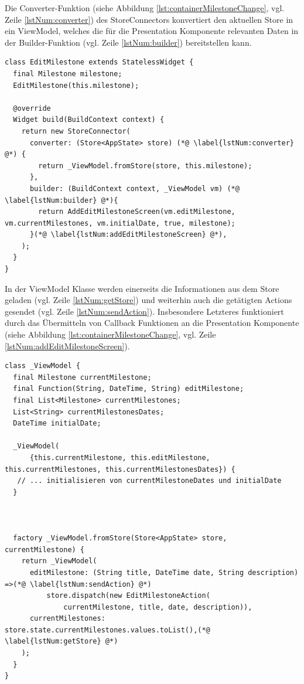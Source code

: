 \documentclass[bibliography=totoc,listof=totoc,BCOR=5mm,DIV=12,oneside]{scrbook}
\begin{document}
\par Die Converter-Funktion (siehe Abbildung \ref{lst:containerMilestoneChange}, vgl. Zeile \ref{lstNum:converter}) des StoreConnectors konvertiert den aktuellen Store in ein ViewModel, welches die für die Presentation Komponente relevanten Daten in der Builder-Funktion (vgl. Zeile \ref{lstNum:builder}) bereitstellen kann.

\bigskip
\begin{lstlisting}[caption={Container Komponente einer Meilensteinänderung},captionpos=b, label=lst:containerMilestoneChange]
class EditMilestone extends StatelessWidget {
  final Milestone milestone;
  EditMilestone(this.milestone);

  @override
  Widget build(BuildContext context) {
    return new StoreConnector(
      converter: (Store<AppState> store) (*@ \label{lstNum:converter} @*) {
        return _ViewModel.fromStore(store, this.milestone);
      },
      builder: (BuildContext context, _ViewModel vm) (*@ \label{lstNum:builder} @*){
        return AddEditMilestoneScreen(vm.editMilestone, vm.currentMilestones, vm.initialDate, true, milestone);
      }(*@ \label{lstNum:addEditMilestoneScreen} @*),
    );
  }
}
\end{lstlisting}
\bigskip

\par In der ViewModel Klasse werden einerseits die Informationen aus dem Store geladen (vgl. Zeile \ref{lstNum:getStore}) und weiterhin auch die getätigten Actions gesendet (vgl. Zeile \ref{lstNum:sendAction}). Insbesondere Letzteres funktioniert durch das Übermitteln von Callback Funktionen an die Presentation Komponente (siehe Abbildung \ref{lst:containerMilestoneChange}, vgl. Zeile \ref{lstNum:addEditMilestoneScreen}).

\newpage
\bigskip
\begin{lstlisting}[caption={ViewModel von Container Komponente einer Meilensteinänderung},captionpos=b, label=lst:containerMilestoneChangeViewModel]
class _ViewModel {
  final Milestone currentMilestone;
  final Function(String, DateTime, String) editMilestone;
  final List<Milestone> currentMilestones;
  List<String> currentMilestonesDates;
  DateTime initialDate;

  _ViewModel(
      {this.currentMilestone, this.editMilestone, this.currentMilestones, this.currentMilestonesDates}) {
   // ... initialisieren von currentMilestoneDates und initialDate
  }

  
  
  factory _ViewModel.fromStore(Store<AppState> store, currentMilestone) {
    return _ViewModel(
      editMilestone: (String title, DateTime date, String description) =>(*@ \label{lstNum:sendAction} @*)
          store.dispatch(new EditMilestoneAction(
              currentMilestone, title, date, description)),
      currentMilestones: store.state.currentMilestones.values.toList(),(*@ \label{lstNum:getStore} @*)
    );
  }
}
\end{lstlisting}
\bigskip
\end{document}
